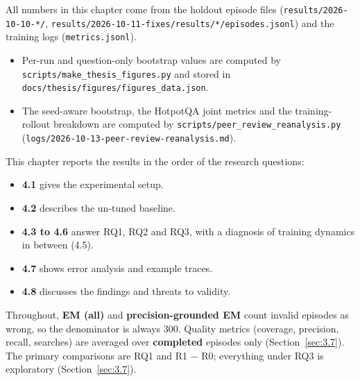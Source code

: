 
All numbers in this chapter come from the holdout episode files
(\texttt{results/\allowbreak{}2026-\allowbreak{}10-\allowbreak{}10-\allowbreak{}*/\allowbreak{}},
\texttt{results/\allowbreak{}2026-\allowbreak{}10-\allowbreak{}11-\allowbreak{}fixes/\allowbreak{}results/\allowbreak{}*/\allowbreak{}episodes.\allowbreak{}jsonl})
and the training logs (\texttt{metrics.\allowbreak{}jsonl}).

\begin{itemize}
\tightlist
\item
  Per-run and question-only bootstrap values are computed by
  \texttt{scripts/\allowbreak{}make\_\allowbreak{}thesis\_\allowbreak{}figures.\allowbreak{}py}
  and stored in
  \texttt{docs/\allowbreak{}thesis/\allowbreak{}figures/\allowbreak{}figures\_\allowbreak{}data.\allowbreak{}json}.
\item
  The seed-aware bootstrap, the HotpotQA joint metrics and the
  training-rollout breakdown are computed by
  \texttt{scripts/\allowbreak{}peer\_\allowbreak{}review\_\allowbreak{}reanalysis.\allowbreak{}py}
  (\texttt{logs/\allowbreak{}2026-\allowbreak{}10-\allowbreak{}13-\allowbreak{}peer-\allowbreak{}review-\allowbreak{}reanalysis.\allowbreak{}md}).
\end{itemize}

This chapter reports the results in the order of the research questions:

\begin{itemize}
\tightlist
\item
  \textbf{4.1} gives the experimental setup.
\item
  \textbf{4.2} describes the un-tuned baseline.
\item
  \textbf{4.3 to 4.6} answer RQ1, RQ2 and RQ3, with a diagnosis of
  training dynamics in between (4.5).
\item
  \textbf{4.7} shows error analysis and example traces.
\item
  \textbf{4.8} discusses the findings and threats to validity.
\end{itemize}

Throughout, \textbf{EM (all)} and \textbf{precision-grounded EM} count
invalid episodes as wrong, so the denominator is always 300. Quality
metrics (coverage, precision, recall, searches) are averaged over
\textbf{completed} episodes only (Section~\ref{sec:3.7}). The primary
comparisons are RQ1 and R1 − R0; everything under RQ3 is exploratory
(Section~\ref{sec:3.7}).

